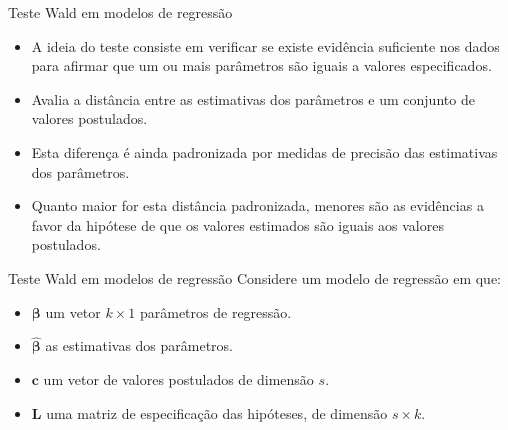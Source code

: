 \documentclass[
  ignorenonframetext,
  serif,
  professionalfont,
  usenames,
  dvipsnames,
  aspectratio = 169]{beamer}
\begin{document}
\begin{frame}{Teste Wald em modelos de regressão}
\protect\hypertarget{teste-wald-em-modelos-de-regressuxe3o}{}
\begin{itemize}
  \itemsep 2ex

  \item A ideia do teste consiste em verificar se existe evidência suficiente nos dados para afirmar que um ou mais parâmetros são iguais a valores especificados.
  
  \item Avalia a distância entre as estimativas dos parâmetros e um conjunto de valores postulados.
  
  \item Esta diferença é ainda padronizada por medidas de precisão das estimativas dos parâmetros. 

  \item Quanto maior for esta distância padronizada, menores são as evidências a favor da hipótese de que os valores estimados são iguais aos valores postulados.


  \end{itemize}
\end{frame}

\begin{frame}{Teste Wald em modelos de regressão}
\protect\hypertarget{teste-wald-em-modelos-de-regressuxe3o-1}{}
Considere um modelo de regressão em que:

\begin{itemize}

  \itemsep 2ex
  
  \item $\boldsymbol{\beta}$ um vetor $k\times1$ parâmetros de regressão.
    
  \item $\boldsymbol{\hat\beta}$ as estimativas dos parâmetros.
    
  \item $\boldsymbol{c}$ um vetor de valores postulados de dimensão $s$.
    
  \item $\boldsymbol{L}$ uma matriz de especificação das hipóteses, de dimensão $s \times k$.  
    
  \end{itemize}
\end{frame}
\end{document}
